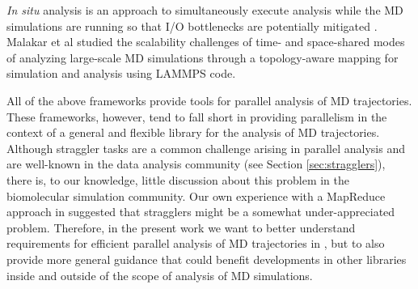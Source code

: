 \textit{In situ} analysis is an approach to simultaneously execute analysis while the MD simulations are running so that I/O bottlenecks are potentially mitigated \cite{Malakar-etal}.
Malakar et al studied the scalability challenges of time- and space-shared modes of analyzing large-scale MD simulations through a topology-aware mapping for simulation and analysis using LAMMPS code.

All of the above frameworks provide tools for parallel analysis of MD trajectories. 
These frameworks, however, tend to fall short in providing parallelism in the context of a general and flexible library for the analysis of MD trajectories.
Although straggler tasks are a common challenge arising in parallel analysis and are well-known in the data analysis community (see Section \ref{sec:stragglers}), there is, to our knowledge, little discussion about this problem in the biomolecular simulation community.
Our own experience with a MapReduce approach in  \cite{Khoshlessan:2017ab} suggested that stragglers might be a somewhat under-appreciated problem.
Therefore, in the present work we want to better understand requirements for efficient parallel analysis of MD trajectories in , but to also provide more general guidance that could benefit developments in other libraries inside and outside of the scope of analysis of MD simulations.





